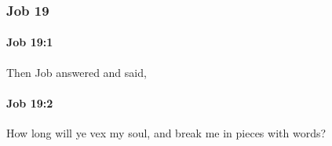 	\subsubsection{Job 19} %
		\label{JOB-19}

		\paragraph{Job 19:1} %
			\label{JOB-19-1}

			Then Job answered and said,


		\paragraph{Job 19:2} %
			\label{JOB-19-2}

			How long will ye vex my soul, and break me in pieces with words?



